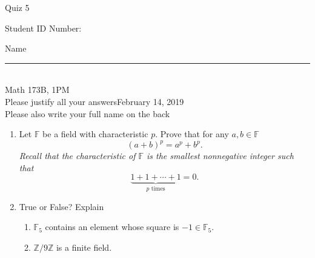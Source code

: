 \documentclass[12pt]{article}
\begin{document}
\begin{flushleft} 
\centerline{\LARGE{Quiz 5}} 
\vspace{5 mm}
{Student ID Number:}\hfill  
{Name \rule {2 in}{0.01in}}\\
Math 173B, 1PM
\\
{Please justify all your answers}\hfill {February 14, 2019}
\\
{Please also write your full name on the back} 

\medskip
\end{flushleft}

\begin{enumerate}
	\item Let $\mathbb{F}$ be a field with characteristic $p$. Prove that for any $a,b\in \mathbb{F}$
	\[
	(a+b)^p = a^p + b^p.
	\]
	\textit{Recall that the characteristic of $\mathbb{F}$ is the smallest nonnegative integer such that}
	\[
	\underbrace{1+1+\cdots+1}_{p\text{ times}} = 0.
	\]
	\vfill

	\item True or False? Explain
	\begin{enumerate}
		\item $\mathbb{F}_5$ contains an element whose square is $-1\in \mathbb{F}_5$.
		\vfill
		\item $\mathbb{Z}/9\mathbb{Z}$ is a finite field.
		\vfill
	\end{enumerate}
\end{enumerate}


\end{document}
